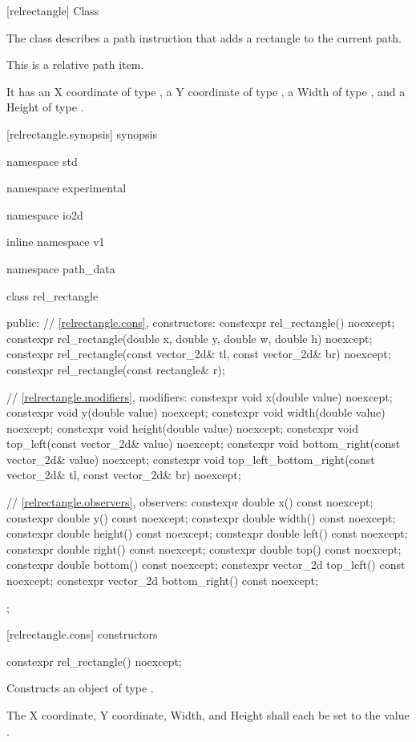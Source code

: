  [relrectangle] {Class }

\pnum
{}
The class  describes a path instruction that adds a rectangle to the current path.

\pnum
This is a relative path item.

\pnum
It has an X coordinate of type , a Y coordinate of type , a Width of type , and a Height of type .

 [relrectangle.synopsis] { synopsis}

\begin{codeblock}
namespace std { namespace experimental { namespace io2d { inline namespace v1 {
  namespace path_data {
    class rel_rectangle {
    public:
      // \ref{relrectangle.cons}, constructors:
      constexpr rel_rectangle() noexcept;
      constexpr rel_rectangle(double x, double y, double w, double h) noexcept;
      constexpr rel_rectangle(const vector_2d& tl, const vector_2d& br) 
        noexcept;
      constexpr rel_rectangle(const rectangle& r);

      // \ref{relrectangle.modifiers}, modifiers:
      constexpr void x(double value) noexcept;
      constexpr void y(double value) noexcept;
      constexpr void width(double value) noexcept;
      constexpr void height(double value) noexcept;
      constexpr void top_left(const vector_2d& value) noexcept;
      constexpr void bottom_right(const vector_2d& value) noexcept;
      constexpr void top_left_bottom_right(const vector_2d& tl,
        const vector_2d& br) noexcept;

      // \ref{relrectangle.observers}, observers:
      constexpr double x() const noexcept;
      constexpr double y() const noexcept;
      constexpr double width() const noexcept;
      constexpr double height() const noexcept;
      constexpr double left() const noexcept;
      constexpr double right() const noexcept;
      constexpr double top() const noexcept;
      constexpr double bottom() const noexcept;
      constexpr vector_2d top_left() const noexcept;
      constexpr vector_2d bottom_right() const noexcept;
    };
  }
} } } }
\end{codeblock}

 [relrectangle.cons] { constructors}

\begin{itemdecl}
constexpr rel_rectangle() noexcept;
\end{itemdecl}
\begin{itemdescr}
\pnum
\effects
Constructs an object of type .

\pnum
The X coordinate, Y coordinate, Width, and Height shall each be set to the value .
\end{itemdescr}

